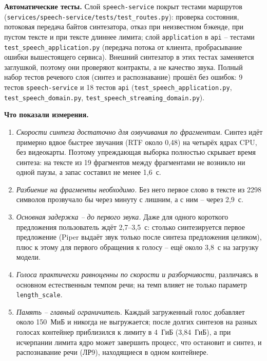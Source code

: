 \textbf{Автоматические тесты.} Слой \texttt{speech-service} покрыт
тестами маршрутов (\texttt{services/speech-service/tests/test\_routes.py}):
проверка состояния, потоковая передача байтов синтезатора, отказ при
неизвестном бэкенде, при пустом тексте и при тексте длиннее лимита;
слой \texttt{application} в \texttt{api} -- тестами
\texttt{test\_speech\_application.py} (передача потока от клиента,
пробрасывание ошибки вышестоящего сервиса). Внешний синтезатор в этих
тестах заменяется заглушкой, поэтому они проверяют контракты, а не
качество звука. Полный набор тестов речевого слоя (синтез и
распознавание) прошёл без ошибок: 9 тестов \texttt{speech-service} и 18
тестов \texttt{api} (\texttt{test\_speech\_application.py},
\texttt{test\_speech\_domain.py}, \texttt{test\_speech\_streaming\_domain.py}).


\textbf{Что показали измерения.}
\begin{enumerate}
  \item \emph{Скорости синтеза достаточно для озвучивания по
  фрагментам.} Синтез идёт примерно вдвое быстрее звучания (RTF около
  0{,}48) на четырёх ядрах CPU, без видеокарты. Поэтому упреждающая
  выборка полностью скрывает время синтеза: на тексте из 19 фрагментов
  между фрагментами не возникло ни одной паузы, а запас составил не
  менее 1{,}6~с.
  \item \emph{Разбиение на фрагменты необходимо.} Без него первое
  слово в тексте из 2298 символов прозвучало бы через минуту с
  лишним, а с ним -- через 2{,}9~с.
  \item \emph{Основная задержка -- до первого звука.} Даже для
  одного короткого предложения пользователь ждёт 2{,}7--3{,}5~с: столько
  синтезируется первое предложение (Piper выдаёт звук только после
  синтеза предложения целиком), плюс к этому для первого обращения к
  голосу -- ещё около 3{,}8~с на загрузку модели.
  \item \emph{Голоса практически равноценны по скорости и
  разборчивости}, различаясь в основном естественным темпом речи;
  на темп влияет не только параметр \texttt{length\_scale}.
  \item \emph{Память -- главный ограничитель.} Каждый загруженный голос
  добавляет около 150~МиБ и никогда не выгружается; после долгих
  синтезов на разных голосах контейнер приблизился к лимиту в 4~ГиБ
  (3{,}84~ГиБ), а при исчерпании лимита ядро может завершить процесс, что остановит
  и синтез, и распознавание речи (ЛР9), находящиеся в одном контейнере.
\end{enumerate}

